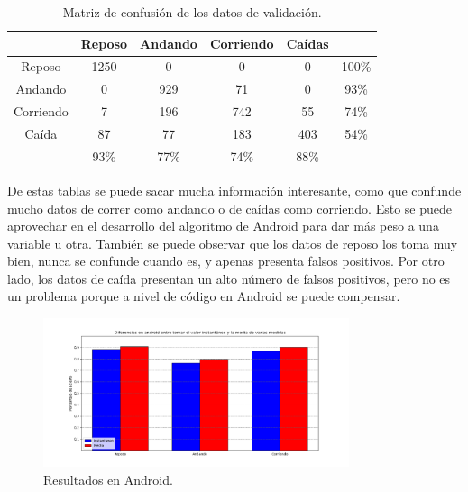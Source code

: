 \documentclass[12pt]{book}
\numberwithin{equation}{section}
\begin{document}
\begin{table}[h]
\centering
  \begin{tabular} {| c || c | c | c | c || c |}
  \hline
   & Reposo & Andando & Corriendo & Caídas & \\
  \hline
  \hline
  Reposo & \cellcolor{green!25}1250 & 0 & 0 & 0 & 100\% \\
  \hline
  Andando & 0 & \cellcolor{green!25}929 & 71 & 0 & 93\% \\
  \hline
  Corriendo & 7 & 196 & \cellcolor{green!25}742 & 55 & 74\% \\
  \hline
  Caída & 87 & 77 & 183 & \cellcolor{green!25}403 & 54\% \\
  \hline
  \hline
   & 	93\% & 77\% & 74\% & 88\% & \\
  \hline
  \end{tabular}
    \caption{Matriz de confusión de los datos de validación.}
  \label{confusionValidation}
\end{table}


De estas tablas se puede sacar mucha información interesante, como que confunde mucho datos de correr como andando o de caídas como corriendo. Esto se puede aprovechar en el desarrollo del algoritmo de Android para dar más peso a una variable u otra. También se puede observar que los datos de reposo los toma muy bien, nunca se confunde cuando es, y apenas presenta falsos positivos. Por otro lado, los datos de caída presentan un alto número de falsos positivos, pero no es un problema porque a nivel de código en Android se puede compensar.


\begin{figure}[h]
    \centering
    \includegraphics[width=0.8\textwidth]{finalesAndroid.png}
    \caption{Resultados en Android.}
    \label{fig:finalesAndroid}
\end{figure}
\end{document}
